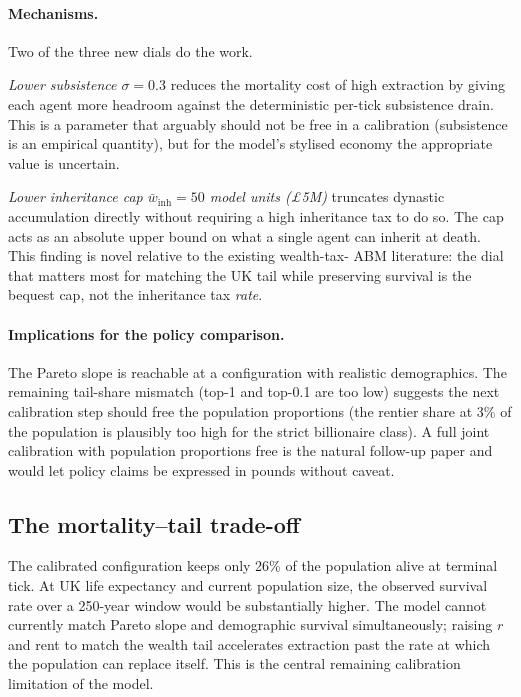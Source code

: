\documentclass[11pt]{article}
\begin{document}
\paragraph{Mechanisms.}  Two of the three new dials do the work.

\emph{Lower subsistence $\sigma = 0.3$} reduces the mortality cost
of high extraction by giving each agent more headroom against the
deterministic per-tick subsistence drain.  This is a parameter that
arguably should not be free in a calibration (subsistence is an
empirical quantity), but for the model's stylised economy the
appropriate value is uncertain.

\emph{Lower inheritance cap $\bar{w}_\text{inh} = 50$
model units (\pounds 5M)} truncates dynastic accumulation directly
without requiring a high inheritance tax to do so.  The cap acts
as an absolute upper bound on what a single agent can inherit at
death.  This finding is novel relative to the existing wealth-tax-
ABM literature: the dial that matters most for matching the
UK tail while preserving survival is the bequest cap, not the
inheritance tax \emph{rate}.

\paragraph{Implications for the policy comparison.}  The Pareto
slope is reachable at a configuration with realistic demographics.
The remaining tail-share mismatch (top-1 and top-0.1 are too low)
suggests the next calibration step should free the population
proportions (the rentier share at 3\% of the population is
plausibly too high for the strict billionaire class).  A full
joint calibration with population proportions free is the natural
follow-up paper and would let policy claims be expressed in pounds
without caveat.

\subsection{The mortality--tail trade-off}

The calibrated configuration keeps only 26\% of the population alive
at terminal tick.  At UK life expectancy and current population
size, the observed survival rate over a 250-year window would be
substantially higher.  The model cannot currently match Pareto slope
and demographic survival simultaneously; raising $r$ and rent to
match the wealth tail accelerates extraction past the rate at which
the population can replace itself.  This is the central remaining
calibration limitation of the model.
\end{document}

